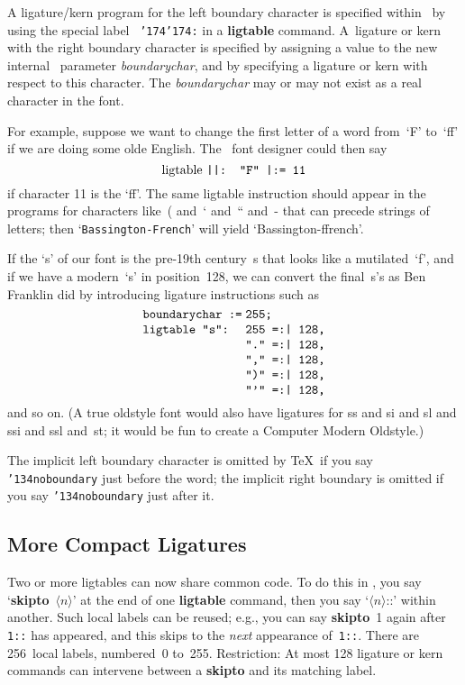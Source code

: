 A ligature/kern program for the left boundary character is specified within
\MF\ by using the special label~
{\tt{\char'174\char'174}:}
in a {\bf ligtable} command. A~ligature or kern with the right
boundary character is specified by assigning a value to the new internal
\MF\ parameter 
{\it boundarychar},
and by specifying a ligature or kern with respect to this character.
The
{\it boundarychar\/}
may or may not exist as a real character in the font.

For example, suppose we want to change the first letter of a word from~`F'
to~`ff' if we are doing some olde English. The \MF\ font designer could then
say
$$\hbox{ligtable {\tt{\char'174\char'174}: "F" {\char'174}:= 11}}$$
if character 11 is the `ff'. The same ligtable instruction should
appear in the programs for characters like~( and~` and~`` and~- that can
precede strings of letters; then `{\tt Bassington-French}' will
yield `Bassington-ffrench'.

If the `s' of our font is the pre-19th
century~s that looks like a mutilated~`f', and if we have a modern~`s'
in position~128, we can convert the final~s's as Ben Franklin did by
introducing ligature instructions such as
$$\vcenter{\halign{{\tt{#}}\hfil$\;$&{\tt{#}}\hfil\cr
boundarychar :=&255;\cr
ligtable "s":&255 =:{\char'174} 128,\cr
&"." =:{\char'174} 128,\cr
&"," =:{\char'174} 128,\cr
&")" =:{\char'174} 128,\cr
&"'" =:{\char'174} 128,\cr}}$$
and so on. (A true oldstyle font would also have 
ligatures for 
ss and si and sl and ssi and ssl
and~st; it would be fun to create a Computer Modern Oldstyle.)

The implicit left boundary character is omitted by \TeX\ if you say
{\tt{\char'134}noboundary}
just before the word; the implicit right boundary is omitted if you say
{\tt{\char'134}noboundary}
just after it.

\subsection{More Compact Ligatures}

Two or more ligtables can now share common code. To do this in \MF, you
say `{\bf skipto}~$\langle n\rangle$' at the end of one {\bf ligtable}
command, then you say `$\langle n\rangle$::' within another. Such local labels
can be reused; e.g., you can say {\bf skipto}~1 again after {\tt 1::} has
appeared, and this skips to the {\it next\/} appearance of~{\tt 1::}.  There
are 256~local labels, numbered~0 to~255. Restriction: At most 128 ligature
or kern commands can intervene between a {\bf skipto} and its matching label.

